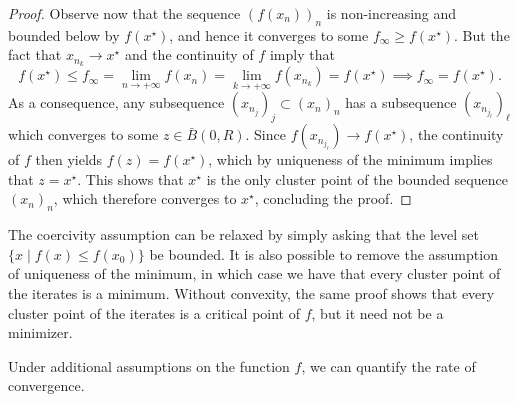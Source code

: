 \begin{proof}
        Observe now that the sequence $(f(x_n))_n$ is non-increasing and bounded below by $f(x^\star)$, and hence it converges to some $f_\infty \ge f(x^\star)$.
        But the fact that $x_{n_k}\rightarrow x^\star$ and the continuity of $f$ imply that 
        \begin{equation}
            f(x^\star)\le f_\infty = \lim_{n\to +\infty} f(x_{n}) = \lim_{k\to +\infty}f(x_{n_k}) =f(x^\star)
            \implies 
            f_\infty = f(x^\star).
        \end{equation}
        As a consequence, any subsequence $(x_{n_j})_j\subset(x_n)_n$ has a subsequence $(x_{n_{j_\ell}})_\ell$ which converges to some $z\in \bar B(0,R)$. Since $f(x_{n_{j_\ell}})\rightarrow f(x^\star)$, the continuity of $f$ then yields $f(z)=f(x^\star)$, which by uniqueness of the minimum implies that $z=x^\star$.
        This shows that $x^\star$ is the only cluster point of the bounded sequence $(x_n)_n$, which therefore converges to $x^\star$, concluding the proof.
     \end{proof}
 
     \begin{remark}
         The coercivity assumption can be relaxed by simply asking that the level set $\{x\mid f(x)\le f(x_0)\}$ be bounded.
         It is also possible to remove the assumption of uniqueness of the minimum, in which case we have that every cluster point of the iterates is a minimum. Without convexity, the same proof shows that every cluster point of the iterates is a critical point of $f$, but it need not be a minimizer.
     \end{remark}
 
     Under additional assumptions on the function $f$, we can quantify the rate of convergence.
 
 
